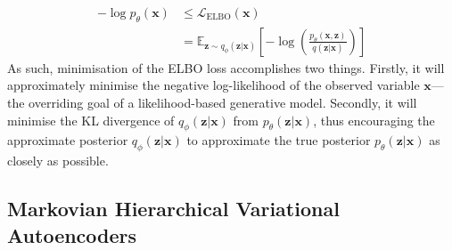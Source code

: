 \documentclass[ oneside,%
                    author={George Herbert},
                    degree={MSci},
                     title={Video Diffusion Models for Climate Simulations},
                  subtitle={}]{dissertation}
\begin{document}
\begin{align}
      -\log p_\theta(\mathbf{x})&\le \mathcal{L}_{\mathrm{ELBO}}(\mathbf{x})\\
      &=\mathbb{E}_{\mathbf{z}\sim q_\phi(\mathbf{z}|\mathbf{x})}\left[-\log\left(\frac{p_\theta(\mathbf{x},\mathbf{z})}{q(\mathbf{z}|\mathbf{x})}\right)\right]
\end{align}
As such, minimisation of the ELBO loss accomplishes two things. Firstly, it will approximately minimise the negative log-likelihood of the observed variable $\mathbf{x}$---the overriding goal of a likelihood-based generative model. Secondly, it will minimise the KL divergence of $q_\phi(\mathbf{z}|\mathbf{x})$ from $p_\theta(\mathbf{z}|\mathbf{x})$, thus encouraging the approximate posterior $q_\phi(\mathbf{z}|\mathbf{x})$ to approximate the true posterior $p_\theta(\mathbf{z}|\mathbf{x})$ as closely as possible. 

\subsection{Markovian Hierarchical Variational Autoencoders}
\label{sec:background_vae_hierarchical}
\end{document}
